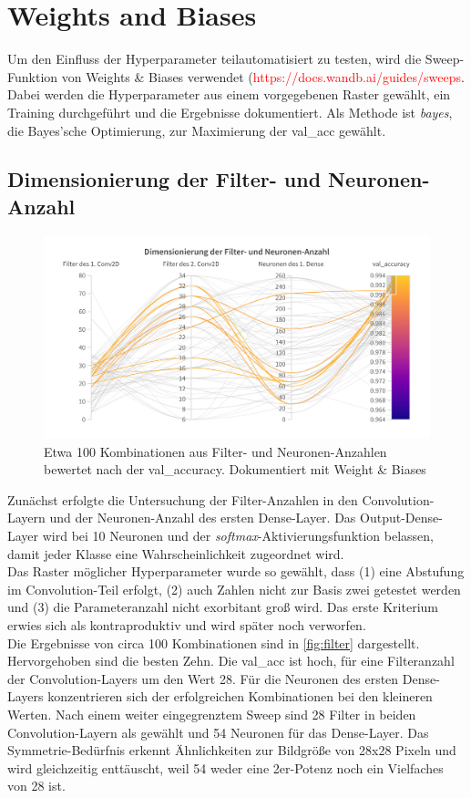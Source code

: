 \documentclass[
fontsize=12pt,					%
paper=a4,						%
twoside=true, 					%
listof=totoc, 					%
bibliography=totoc,				%
titlepage, 						%
headsepline, 					%
DIV=12,							%
BCOR=6mm,						%
cleardoublepage=empty,			%
parskip,							%
ngerman
]{scrartcl}
\begin{document}
\section{Weights and Biases}

Um den Einfluss der Hyperparameter teilautomatisiert zu testen, wird die Sweep-Funktion von Weights \& Biases verwendet (\textcolor{red}{https://docs.wandb.ai/guides/sweeps}. Dabei werden die Hyperparameter aus einem vorgegebenen Raster gewählt, ein Training durchgeführt und die Ergebnisse dokumentiert. Als Methode ist \emph{bayes}, die Bayes'sche Optimierung, zur Maximierung der val\_acc gewählt.

\subsection{Dimensionierung der Filter- und Neuronen-Anzahl}

\begin{figure}
	\centering
	\includegraphics[width=0.7\linewidth]{images/Filter}
	\caption{Etwa 100 Kombinationen aus Filter- und Neuronen-Anzahlen bewertet nach der val\_accuracy. Dokumentiert mit Weight \& Biases}
	\label{fig:filter}
\end{figure}

Zunächst erfolgte die Untersuchung der Filter-Anzahlen in den Convolution-Layern und der Neuronen-Anzahl des ersten Dense-Layer. Das Output-Dense-Layer wird bei 10 Neuronen und der \emph{softmax}-Aktivierungsfunktion belassen, damit jeder Klasse eine Wahrscheinlichkeit zugeordnet wird.\\
Das Raster möglicher Hyperparameter wurde so gewählt, dass (1) eine Abstufung im Convolution-Teil erfolgt, (2) auch Zahlen nicht zur Basis zwei getestet werden und (3) die Parameteranzahl nicht exorbitant groß wird. Das erste Kriterium erwies sich als kontraproduktiv und wird später noch verworfen.\\
Die Ergebnisse von circa 100 Kombinationen sind in \autoref{fig:filter} dargestellt. Hervorgehoben sind die besten Zehn. Die val\_acc ist hoch, für eine Filteranzahl der Convolution-Layers um den Wert 28. Für die Neuronen des ersten Dense-Layers konzentrieren sich der erfolgreichen Kombinationen bei den kleineren Werten. Nach einem weiter eingegrenztem Sweep sind 28 Filter in beiden Convolution-Layern als gewählt und 54 Neuronen für das Dense-Layer. Das Symmetrie-Bedürfnis erkennt Ähnlichkeiten zur Bildgröße von 28x28 Pixeln und wird gleichzeitig enttäuscht, weil 54 weder eine 2er-Potenz noch ein Vielfaches von 28 ist.
\end{document}

